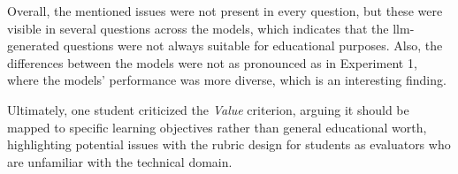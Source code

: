 Overall, the mentioned issues were not present in every question, but these were visible in several questions across the models, which indicates that the \ac{llm}-generated questions were not always suitable for educational purposes. Also, the differences between the models were not as pronounced as in Experiment 1, where the models' performance was more diverse, which is an interesting finding.

Ultimately, one student criticized the \textit{Value} criterion, arguing it should be mapped to specific learning objectives rather than general educational worth, highlighting potential issues with the rubric design for students as evaluators who are unfamiliar with the technical domain.

\vp